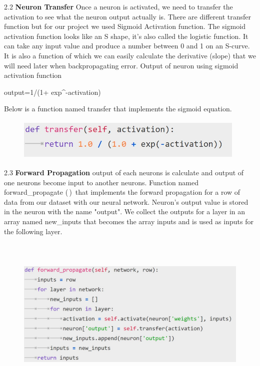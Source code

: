 2.2 \textbf{Neuron Transfer}
Once a neuron is activated, we need to transfer the activation to see what the neuron output actually is.
There are different transfer function but for our project we used Sigmoid Activation function.\newline
The sigmoid activation function looks like an S shape, it’s also called the logistic function. It can take any input value and produce a number between 0 and 1 on an S-curve. It is also a function of which we can easily calculate the derivative (slope) that we will need later when backpropagating error.
\newline
Output of neuron using sigmoid activation function \newline
{output=1/(1+ exp^{-activation})

Below is a function named transfer that implements the sigmoid equation.

\begin{figure}[H]
\begin{center}
\includegraphics[width=110mm,height=20mm]{backexplain/transfer.jpg}
\end{center}
     
\end{figure} 

2.3 \textbf{Forward Propagation}
output of each neurons is calculate and output of one neurons become input to another neurons.\newline
Function named forward\_propagate (\,)\, that implements the forward propagation for a row of data from our dataset with our neural network.
Neuron’s output value is stored in the neuron with the name "output". We collect the outputs for a layer in an array named new\_inputs that becomes the array inputs and is used as inputs for the following layer.

\begin{figure}[H]
\begin{center}
\includegraphics[width=160mm,height=75mm]{backexplain/forward.jpg}
\end{center}
\end{figure} 

}
